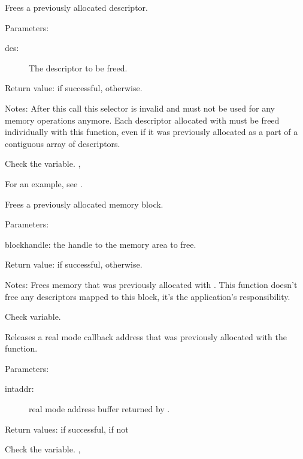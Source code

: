 {Frees a previously allocated descriptor.

Parameters:
\begin{description}
\item[des:\ ] The descriptor to be freed.
\end{description}

Return value:  if successful,  otherwise.

Notes: After this call this selector is invalid and must not be used for any
memory operations anymore. Each descriptor allocated with
 must be freed 
individually with this function,
even if it was previously allocated as a part of a contiguous array of
descriptors.
}{Check the  variable.}{
,
}

For an example, see 
.

{Frees a previously allocated memory block.

Parameters: 
\begin{description}
\item{blockhandle:} the handle to the memory area to free.
\end{description}

Return value:  if successful,  otherwise.

Notes: Frees memory that was previously allocated with
 . 
This function doesn't free any descriptors mapped to this block, 
it's the application's responsibility.
}
{ Check  variable.}
{ }

{
Releases a real mode callback address that was previously allocated with the
  function.

Parameters: 
\begin{description}
\item[intaddr:\ ] real mode address buffer returned by 
 .
\end{description}

Return values:  if successful,  if not
}{ Check the  variable.}
{
,
}

